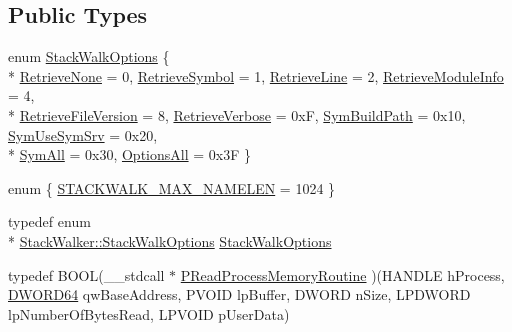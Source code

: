 \subsection*{Public Types}
\begin{DoxyCompactItemize}
\item 
enum \hyperlink{class_stack_walker_aa09267d1a2142548625d11131fd9f6d2}{Stack\-Walk\-Options} \{ \\*
\hyperlink{class_stack_walker_aa09267d1a2142548625d11131fd9f6d2a217edd06baf71722717097d0dfa1f766}{Retrieve\-None} = 0, 
\hyperlink{class_stack_walker_aa09267d1a2142548625d11131fd9f6d2a7e8ceb867b904c580c6f745f5d182802}{Retrieve\-Symbol} = 1, 
\hyperlink{class_stack_walker_aa09267d1a2142548625d11131fd9f6d2abb12b49bb039b045e1d8aeb530bc4941}{Retrieve\-Line} = 2, 
\hyperlink{class_stack_walker_aa09267d1a2142548625d11131fd9f6d2aa84a7a674a45b13f77ca173e44917cbf}{Retrieve\-Module\-Info} = 4, 
\\*
\hyperlink{class_stack_walker_aa09267d1a2142548625d11131fd9f6d2aa955b878359106a2494f579faccb2354}{Retrieve\-File\-Version} = 8, 
\hyperlink{class_stack_walker_aa09267d1a2142548625d11131fd9f6d2a91202654d609646725e168223b0f1551}{Retrieve\-Verbose} = 0x\-F, 
\hyperlink{class_stack_walker_aa09267d1a2142548625d11131fd9f6d2a80f3f984925d8c6e322d087770edf6c6}{Sym\-Build\-Path} = 0x10, 
\hyperlink{class_stack_walker_aa09267d1a2142548625d11131fd9f6d2a9a1c39fb96215df2b05d12c02d198698}{Sym\-Use\-Sym\-Srv} = 0x20, 
\\*
\hyperlink{class_stack_walker_aa09267d1a2142548625d11131fd9f6d2aa8ab514748c8fed1fcaf8b50d35123cb}{Sym\-All} = 0x30, 
\hyperlink{class_stack_walker_aa09267d1a2142548625d11131fd9f6d2a2955cdf5dd2683a3951f89d41d8b9c3c}{Options\-All} = 0x3\-F
 \}
\item 
enum \{ \hyperlink{class_stack_walker_a1744699928d413e6223b3c16df901ccfa9be56eae1b6e1edf9fbcd5df5e7dbb91}{S\-T\-A\-C\-K\-W\-A\-L\-K\-\_\-\-M\-A\-X\-\_\-\-N\-A\-M\-E\-L\-E\-N} = 1024
 \}
\item 
typedef enum \\*
\hyperlink{class_stack_walker_aa09267d1a2142548625d11131fd9f6d2}{Stack\-Walker\-::\-Stack\-Walk\-Options} \hyperlink{class_stack_walker_a547d82a4196c05a09fd365d83ca9cd44}{Stack\-Walk\-Options}
\item 
typedef B\-O\-O\-L(\-\_\-\-\_\-stdcall $\ast$ \hyperlink{class_stack_walker_a61956985807c0d6c582304c78c6dc85c}{P\-Read\-Process\-Memory\-Routine} )(H\-A\-N\-D\-L\-E h\-Process, \hyperlink{_stack_walker_8h_a97fb241c597b99bcb965858f53cacac4}{D\-W\-O\-R\-D64} qw\-Base\-Address, P\-V\-O\-I\-D lp\-Buffer, D\-W\-O\-R\-D n\-Size, L\-P\-D\-W\-O\-R\-D lp\-Number\-Of\-Bytes\-Read, L\-P\-V\-O\-I\-D p\-User\-Data)
\end{DoxyCompactItemize}

